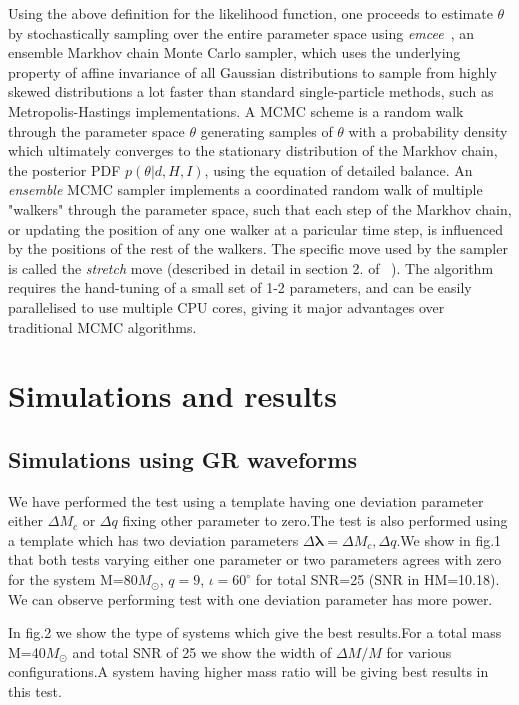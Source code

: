 \documentclass[prd,preprintnumbers,twocolumn,eqsecnum,floatfix,a4paper,nofootinbib,superscriptaddress]{revtex4}
\newcommand{\blambda}{\bm{\lambda}}
\begin{document}
Using the above definition for the likelihood function, one proceeds to estimate $\theta$ by stochastically sampling over the entire parameter space using  \emph{emcee}~\cite{goodman2010ensemble,foreman2013emcee}, an ensemble Markhov chain Monte Carlo sampler, which uses the underlying property of affine invariance of all Gaussian distributions to sample from highly skewed distributions a lot faster than standard single-particle methods, such as Metropolis-Hastings implementations. A MCMC scheme is a random walk through the parameter space $\theta$ generating samples of $\theta$ with a probability density which ultimately converges to the stationary distribution of the Markhov chain, the posterior PDF $p(\theta|d, H, I)$, using the equation of detailed balance. An \emph{ensemble} MCMC sampler implements a coordinated random walk of multiple "walkers" through the parameter space, such that each step of the Markhov chain, or updating the position of any one walker at a paricular time step, is influenced by the positions of the rest of the walkers. The specific move used by the sampler is called the \emph{stretch} move (described in detail in section 2. of ~\cite{goodman2010ensemble}). The algorithm requires the hand-tuning of a small set of 1-2 parameters, and can be easily parallelised to use multiple CPU cores, giving it major advantages over traditional MCMC algorithms.

\section{Simulations and results}
\subsection{Simulations using GR waveforms}
We have performed the test using a template having one deviation parameter either $\Delta M_c$ or $\Delta q$ fixing other parameter to zero.The test is also performed using a template which has two deviation parameters $\Delta \blambda={\Delta M_c, \Delta q}$.We show in fig.1 that both tests varying either one parameter or two parameters agrees with zero for the system M=80$M_{\odot}$, $q=9$, $ {\iota}=60^{\circ} $ for total SNR=25 (SNR in HM=10.18). We can observe performing test with one deviation parameter has more power.

In fig.2 we show the type of systems which give the best results.For a total mass M=40$M_{\odot}$ and total SNR of 25 we show the width of $\Delta M/M$ for various configurations.A system having higher mass ratio will be giving best results in this test.
\end{document}
